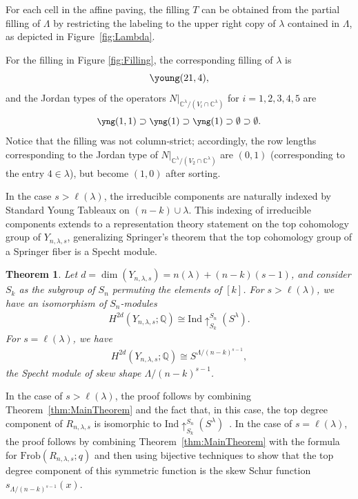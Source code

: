\documentclass[submission]{FPSAC2021}
\theoremstyle{plain}
\newtheorem{theorem}{Theorem}[section]
\newenvironment{example}
 {\pushQED{\qed}\examplex}
  {\popQED\endexamplex}
\numberwithin{equation}{section}
\newcommand{\bC}{\mathbb{C}}
\newcommand{\bQ}{\mathbb{Q}}
\newcommand{\Frob}{\mathrm{Frob}}
\newcommand{\la}{\lambda}
\begin{document}
For each cell in the affine paving, the filling $T$ can be obtained from the partial filling of $\Lambda$ by restricting the labeling to the upper right copy of $\lambda$ contained in $\Lambda$, as depicted in Figure~\ref{fig:Lambda}.

\begin{example}
For the filling in Figure \ref{fig:Filling}, the corresponding filling of $\lambda$ is
\[\young(21,4),\]
and the Jordan types of the operators $N|_{\bC^\lambda/(V_i\cap \bC^\lambda)}$ for $i=1,2,3,4,5$ are
\[
{\small \yng(1,1)}\supset {\small \yng(1)}\supset {\small \yng(1)}\supset \emptyset \supset \emptyset.
\]
Notice that the filling was not column-strict; accordingly, the row lengths corresponding to the Jordan type of $N|_{\bC^\lambda/(V_2\cap \bC^\lambda)}$ are $(0, 1)$ (corresponding to the entry $4 \in \lambda$), but become $(1, 0)$ after sorting.
\end{example}

In the case $s>\ell(\la)$, the irreducible components are naturally indexed by Standard Young Tableaux on $(n-k) \cup \la$.  This indexing of irreducible components extends to a representation theory statement on the top cohomology group of $Y_{n,\lambda,s}$, generalizing Springer's theorem that the top cohomology group of a Springer fiber is a Specht module.
 

\begin{theorem}
Let $d = \dim(Y_{n,\la,s}) = n(\la) + (n-k)(s-1)$, and consider $S_k$ as the subgroup of $S_n$ permuting the elements of $[k]$. For $s>\ell(\la)$, we have an isomorphism of $S_n$-modules
\begin{align}
H^{2d}(Y_{n,\la,s};\bQ) \cong \mathrm{Ind}\!\uparrow_{S_k}^{S_n} (S^\la).
\end{align}
For $s=\ell(\la)$, we have
\begin{align}\label{eq:SLengthLambdaIso}
    H^{2d}(Y_{n,\la,s};\bQ) \cong S^{\Lambda/(n-k)^{s-1}},
\end{align}
the Specht module of skew shape $\Lambda/(n-k)^{s-1}$.
\end{theorem}

In the case of $s>\ell(\la)$, the proof follows by combining Theorem~\ref{thm:MainTheorem} and the fact that, in this case, the top degree component of $R_{n,\lambda,s}$ is isomorphic to $\mathrm{Ind}\!\!\uparrow_{S_k}^{S_n}(S^\lambda)$~\cite[Corollary 3.3.15]{GriffinThesis}. In the case of $s=\ell(\la)$, the proof follows by combining Theorem~\ref{thm:MainTheorem} with the formula \cite[Theorem 5.13]{GriffinOSP} for $\Frob(R_{n,\lambda,s};q)$ and then using bijective techniques to show that the top degree component of this symmetric function is the skew Schur function $s_{\Lambda/(n-k)^{s-1}}(x)$.
\end{document}
